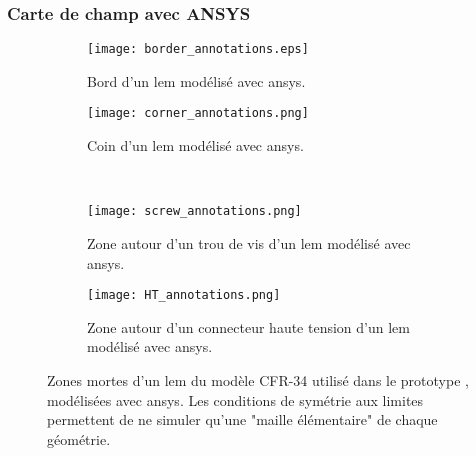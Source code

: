       \subsubsection{Carte de champ avec ANSYS}
                
        \begin{figure}[htbp]
          \begin{subfigure}[t]{0.61\textwidth}
            \centering
            \texttt{[image: border\_annotations.eps]}
            \caption{\label{fig::lem_border}Bord d'un \gls{lem} modélisé avec \gls{ansys}.}
          \end{subfigure}
          \hfill
          \begin{subfigure}[t]{0.31\textwidth}
            \centering
            \texttt{[image: corner\_annotations.png]}
            \caption{\label{fig::corner}Coin d'un \gls{lem} modélisé avec \gls{ansys}.}
          \end{subfigure}\\
          \begin{subfigure}[b]{0.42\textwidth}
            \centering
            \texttt{[image: screw\_annotations.png]}
            \caption{\label{fig::screw}Zone autour d'un trou de vis d'un \gls{lem} modélisé avec \gls{ansys}.}
          \end{subfigure}
          \hfill
          \begin{subfigure}[b]{0.48\textwidth}
            \centering
            \texttt{[image: HT\_annotations.png]}
            \caption{\label{fig::HT}Zone autour d'un connecteur haute tension d'un \gls{lem} modélisé avec \gls{ansys}.}
          \end{subfigure}
          \caption[Zones mortes d'un LEM modélisé avec ANSYS]{Zones mortes d'un \gls{lem} du modèle CFR-34 utilisé dans le prototype \TOO{}, modélisées avec \gls{ansys}. Les conditions de symétrie aux limites permettent de ne simuler qu'une "maille élémentaire" de chaque géométrie.}
          \label{fig::dead_zones}
        \end{figure}
            
